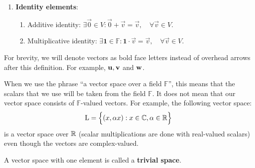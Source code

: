 \begin{definition}
\begin{enumerate}
		\item \textbf{Identity elements}:
		\begin{enumerate}[label=\roman*]\addtocounter{enumii}{8}
			\item Additive identity: $\exists\vec{0} \in V: \vec{0} + \vec{v} = \vec{v}, \quad \forall \vec{v}\in V$.
			\item Multiplicative identity: $\exists \boldsymbol{1}\in\mathbb{F}: \boldsymbol{1}\cdot\vec{v} = \vec{v},\quad \forall \vec{v} \in V$.	
		\end{enumerate} 
	\end{enumerate} 

	\noindent For brevity, we will denote vectors as bold face letters instead of overhead arrows after this definition. For example, ${\bf u}, {\bf v}$ and ${\bf w}$.
\end{definition} 

\begin{remark}
	When we use the phrase ``a vector space over a field $\mathbb{F}$'', this means that the scalars that we use will be taken from the field $\mathbb{F}$. It does not mean that our vector space consists of $\mathbb{F}$-valued vectors. For example, the following vector space:
	\begin{align*}
		\mathrm{L} = \Big\{ (x, \alpha x) : x\in\mathbb{C}, \alpha\in\mathbb{R} \Big\}	
	\end{align*}
	is a vector space over $\mathbb{R}$ (scalar multiplications are done with real-valued scalars) even though the vectors are complex-valued.
\end{remark} 

\begin{remark}
	A vector space with one element is called a \textbf{trivial space}.	
\end{remark} 

